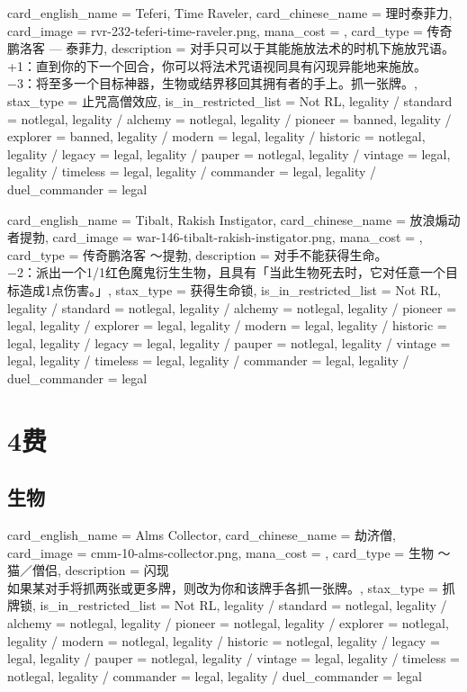 \documentclass[lang = cn, color = black, 10pt]{AllThatStax}
\begin{document}
\card
{
	card_english_name = {Teferi, Time Raveler},
	card_chinese_name = {理时泰菲力},
	card_image = rvr-232-teferi-time-raveler.png,
	mana_cost = ,
	card_type = 传奇鹏洛客 — 泰菲力,
	description = {对手只可以于其能施放法术的时机下施放咒语。\\
		+1：直到你的下一个回合，你可以将法术咒语视同具有闪现异能地来施放。\\
		−3：将至多一个目标神器，生物或结界移回其拥有者的手上。抓一张牌。},
	stax_type = 止咒高僧效应,
	is_in_restricted_list = Not RL,
	legality / standard = notlegal,
	legality / alchemy = notlegal,
	legality / pioneer = banned,
	legality / explorer = banned,
	legality / modern = legal,
	legality / historic = notlegal,
	legality / legacy = legal,
	legality / pauper = notlegal,
	legality / vintage = legal,
	legality / timeless = legal,
	legality / commander = legal,
	legality / duel_commander = legal
}

\card
{
	card_english_name = {Tibalt, Rakish Instigator},
	card_chinese_name = {放浪煽动者提勃},
	card_image = war-146-tibalt-rakish-instigator.png,
	mana_cost = ,
	card_type = 传奇鹏洛客 ～提勃,
	description = {对手不能获得生命。\\
		−2：派出一个1/1红色魔鬼衍生生物，且具有「当此生物死去时，它对任意一个目标造成1点伤害。」},
	stax_type = 获得生命锁,
	is_in_restricted_list = Not RL,
	legality / standard = notlegal,
	legality / alchemy = notlegal,
	legality / pioneer = legal,
	legality / explorer = legal,
	legality / modern = legal,
	legality / historic = legal,
	legality / legacy = legal,
	legality / pauper = notlegal,
	legality / vintage = legal,
	legality / timeless = legal,
	legality / commander = legal,
	legality / duel_commander = legal
}

\chapter{4费}

\section{生物}

\card
{
	card_english_name = {Alms Collector},
	card_chinese_name = {劫济僧},
	card_image = cmm-10-alms-collector.png,
	mana_cost = ,
	card_type = 生物 ～猫／僧侣,
	description = {闪现\\
		如果某对手将抓两张或更多牌，则改为你和该牌手各抓一张牌。},
	stax_type = 抓牌锁,
	is_in_restricted_list = Not RL,
	legality / standard = notlegal,
	legality / alchemy = notlegal,
	legality / pioneer = notlegal,
	legality / explorer = notlegal,
	legality / modern = notlegal,
	legality / historic = notlegal,
	legality / legacy = legal,
	legality / pauper = notlegal,
	legality / vintage = legal,
	legality / timeless = notlegal,
	legality / commander = legal,
	legality / duel_commander = legal
}
\end{document}
